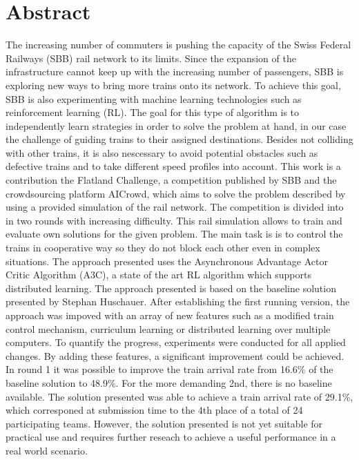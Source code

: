 \chapter*{Abstract}\label{abstract}
The increasing number of commuters is pushing the capacity of the Swiss Federal Railways (SBB) rail network to its limits. Since the expansion of the infrastructure cannot keep up with the increasing number of passengers, SBB is exploring new ways to bring more trains onto its network. To achieve this goal, SBB is also experimenting with machine learning technologies such as reinforcement learning (RL). 
The goal for this type of algorithm is to independently learn strategies  in order to solve the problem at hand, in our case the challenge of guiding trains to their assigned destinations. Besides not colliding with other trains, it is also nescessary to avoid potential obstacles such as defective trains and to take different speed profiles into account. This work is a contribution the Flatland Challenge, a competition published by SBB and the crowdsourcing platform AICrowd, which aims to solve the problem described by using a provided simulation of the rail network. The competition is divided into in two rounds with increasing difficulty. This rail simulation allows to train and evaluate own solutions for the given problem. The main task is is to control the trains in cooperative way so they do not block each other even in complex situations. The approach presented uses the Asynchronous Advantage Actor Critic Algorithm (A3C), a state of the art RL algorithm which supports distributed learning. The approach presented is based on the baseline solution presented by Stephan Huschauer. After establishing the first running version, the approach was impoved with an array of new features such as a modified train control mechanism, curriculum learning or distributed learning over multiple computers. To quantify the progress, experiments were conducted for all applied changes. By adding these features, a significant improvement could be achieved. In round 1 it was possible to improve the train arrival rate from 16.6\% of the baseline solution to 48.9\%.
For the more demanding 2nd, there is no baseline available. The solution presented was able to achieve a train arrival rate of 29.1\%, which corresponed at submission time to the 4th place of a total of 24 participating teams.
However, the solution presented is not yet suitable for practical use and requires further reseach to achieve a useful performance in a real world scenario.

